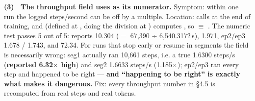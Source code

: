 \documentclass[11pt,openany]{article}
\begin{document}
\textbf{(3) \ The throughput field uses  as its numerator.} Symptom: within one
run the logged steps/second can be off by a multiple. Location:
\linebreak[0]\linebreak[0]\linebreak[0] calls \linebreak[0]\linebreak[0]\linebreak[0]\linebreak[0]\linebreak[0]\linebreak[0]
at the end of training, and \linebreak[0] (defined at \linebreak[0]\linebreak[0], doing
the division at ) computes \linebreak[0], so
\textbf{\linebreak[0]\linebreak[0] $\equiv$ \linebreak[0]\linebreak[0]}. The numeric
test passes 5 out of 5: \linebreak[0] reports 10.304 ($=$ 67{,}390 $\div$ 6{,}540.3172\,s),
\linebreak[0] 1.971, ep2/ep3 1.678 / 1.743, and \linebreak[0]\linebreak[0] 72.34. For runs
that stop early or resume in segments the field is necessarily wrong: seg1 actually ran 10{,}661
steps, i.e. a true 1.6300 steps/s (\textbf{reported 6.32$\times$ high}) and seg2 1.6633 steps/s
(1.185$\times$); ep2/ep3 ran every step and happened to be right --- \textbf{and ``happening to be
right'' is exactly what makes it dangerous.} Fix: every throughput number in \S4.5 is recomputed
from real steps and real tokens.
\end{document}
